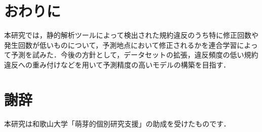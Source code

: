 \documentclass[uplatex,dvipdfmx,a4paper,twocolumn,base=11pt,jbase=11pt,ja=standard]{bxjsarticle}  %
\newcommand{\todo}[1]{\colorbox{yellow}{{\bf TODO}:}{\color{red} {\textbf{[#1]}}}}
\begin{document}

%
%






\section{おわりに}

本研究では，静的解析ツールによって検出された規約違反のうち特に修正回数や発生回数が低いものについて，予測地点において修正されるかを連合学習によって予測を試みた．今後の方針として，データセットの拡張，違反頻度の低い規約違反への重み付けなどを用いて予測精度の高いモデルの構築を目指す．






\section*{謝辞}
本研究は和歌山大学「萌芽的個別研究支援」の助成を受けたものです．
\end{document}
